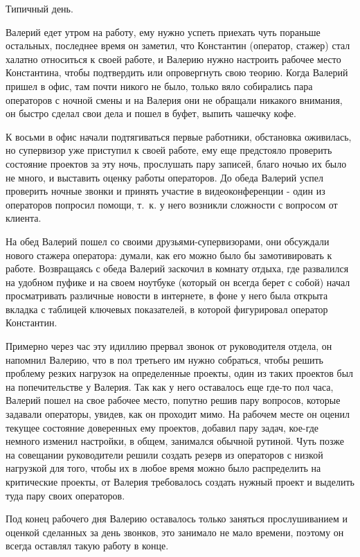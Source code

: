 Типичный день.

Валерий едет утром на работу, ему нужно успеть приехать чуть пораньше остальных,
последнее время он заметил, что Константин (оператор, стажер)
стал халатно относиться к своей работе,
и Валерию нужно настроить рабочее место Константина,
чтобы подтвердить или опровергнуть свою теорию.
Когда Валерий пришел в офис, там почти никого не было,
только вяло собирались пара операторов с ночной смены
и на Валерия они не обращали никакого внимания,
он быстро сделал свои дела и пошел в буфет, выпить чашечку кофе.

К восьми в офис начали подтягиваться первые работники, обстановка оживилась,
но супервизор уже приступил к своей работе,
ему еще предстояло проверить состояние проектов за эту ночь,
прослушать пару записей, благо ночью их было не много,
и выставить оценку работы операторов.
До обеда Валерий успел проверить ночные звонки и принять участие в
видеоконференции - один из операторов попросил помощи,
т.~к. у него возникли сложности с вопросом от клиента.

На обед Валерий пошел со своими друзьями-супервизорами, они обсуждали нового стажера оператора: думали, как его можно было бы замотивировать к работе. Возвращаясь с обеда Валерий заскочил в комнату отдыха, где развалился на удобном пуфике и на своем ноутбуке (который он всегда берет с собой) начал просматривать различные новости в интернете, в фоне у него была открыта вкладка с таблицей ключевых показателей, в которой фигурировал оператор Константин.

Примерно через час эту идиллию прервал звонок от руководителя отдела, он напомнил Валерию, что в пол третьего им нужно собраться, чтобы решить проблему резких нагрузок на определенные проекты, один из таких проектов был на попечительстве у Валерия. Так как у него оставалось еще где-то пол часа, Валерий пошел на свое рабочее место, попутно решив пару вопросов, которые задавали операторы, увидев, как он проходит мимо. На рабочем месте он оценил текущее состояние доверенных ему проектов, добавил пару задач, кое-где немного изменил настройки, в общем, занимался обычной рутиной. Чуть позже на совещании руководители решили создать резерв из операторов с низкой нагрузкой для того, чтобы их в любое время можно было распределить на критические проекты, от Валерия требовалось создать нужный проект и выделить туда пару своих операторов.

Под конец рабочего дня Валерию оставалось только заняться прослушиванием и оценкой сделанных за день звонков, это занимало не мало времени, поэтому он всегда оставлял такую работу в конце.

